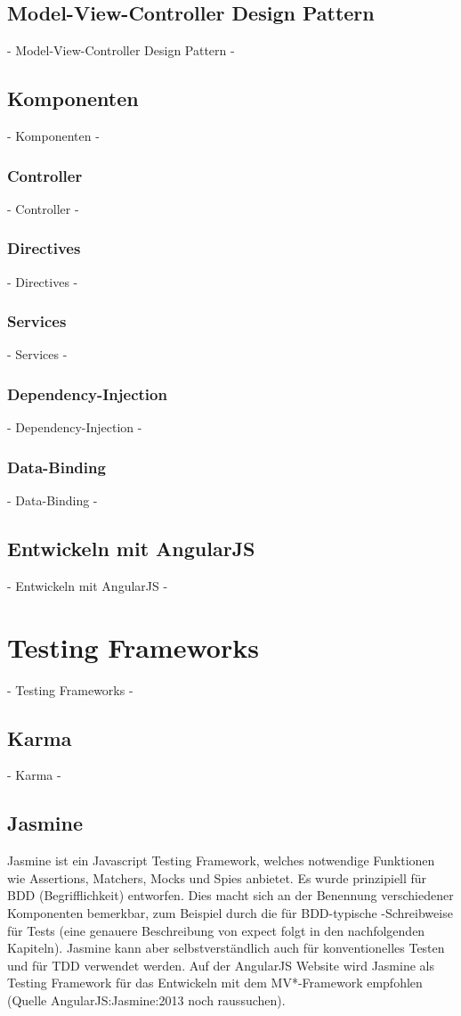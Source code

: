 \subsection{Model-View-Controller Design Pattern}
 - Model-View-Controller Design Pattern -
\subsection{Komponenten}
 - Komponenten -

\subsubsection{Controller}
 - Controller -
\subsubsection{Directives}
 - Directives -
\subsubsection{Services}
 - Services -
\subsubsection{Dependency-Injection}
 - Dependency-Injection -
\subsubsection{Data-Binding}
 - Data-Binding -

\subsection{Entwickeln mit AngularJS}
 - Entwickeln mit AngularJS -

\newpage
\section{Testing Frameworks}
 - Testing Frameworks -

\subsection{Karma}
 - Karma -

\subsection{Jasmine}
Jasmine ist ein Javascript Testing Framework, welches notwendige Funktionen wie Assertions, Matchers, Mocks und Spies anbietet. Es wurde prinzipiell für BDD (Begrifflichkeit) entworfen. Dies macht sich an der Benennung verschiedener Komponenten bemerkbar, zum Beispiel durch die für BDD-typische -Schreibweise für Tests (eine genauere Beschreibung von expect folgt in den nachfolgenden Kapiteln). Jasmine kann aber selbstverständlich auch für konventionelles Testen und für TDD verwendet werden. Auf der AngularJS Website wird Jasmine als Testing Framework für das Entwickeln mit dem MV*-Framework empfohlen (Quelle {AngularJS:Jasmine:2013} noch raussuchen).

